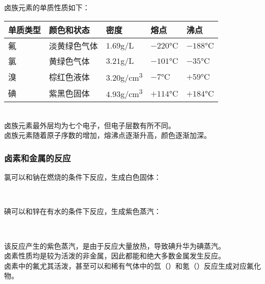 \documentclass[UTF8]{ctexart}
\begin{document}
    卤族元素的单质性质如下：\vspace{5pt}
    \begin{table}[h]
        \begin{center}
            \begin{tabular}{p{50pt}|p{85pt}|p{75pt}|p{70pt}|p{70pt}}
                \hline
                单质类型&颜色和状态&密度&熔点&沸点\\ \hline
                氟&淡黄绿色气体&$1.69$\si{g/L}&$-220$\si{\degreeCelsius}&$-188$\si{\degreeCelsius}\\ \hline
                氯&黄绿色气体&$3.21$\si{g/L}&$-101$\si{\degreeCelsius}&$-35$\si{\degreeCelsius}\\ \hline
                溴&棕红色液体&$3.20$\si{g/cm^3}&$-7$\si{\degreeCelsius}&$+59$\si{\degreeCelsius}\\ \hline
                碘&紫黑色固体&$4.93$\si{g/cm^3}&$+114$\si{\degreeCelsius}&$+184$\si{\degreeCelsius}\\ \hline
            \end{tabular}
        \end{center}
    \end{table}\\
    卤族元素最外层均为七个电子，但电子层数有所不同。\\[3mm]
    卤族元素随着原子序数的增加，熔沸点逐渐升高，颜色逐渐加深。

\newpage

\subsubsection{卤素和金属的反应}
    氯可以和钠在燃烧的条件下反应，生成白色固体：
    \begin{center}
        \\[4mm]
    \end{center}
    碘可以和锌在有水的条件下反应，生成紫色蒸汽：
    \begin{center}
        \\[4mm]
    \end{center}
    该反应产生的紫色蒸汽，是由于反应大量放热，导致碘升华为碘蒸汽。\\[3mm]
    卤素性质均是较为活泼的非金属，因此都能和绝大多数金属发生反应。\\[3mm]
    卤素中的氟尤其活泼，甚至可以和稀有气体中的氙（）和氪（）反应生成对应氟化物。\vspace{5pt}
\end{document}
